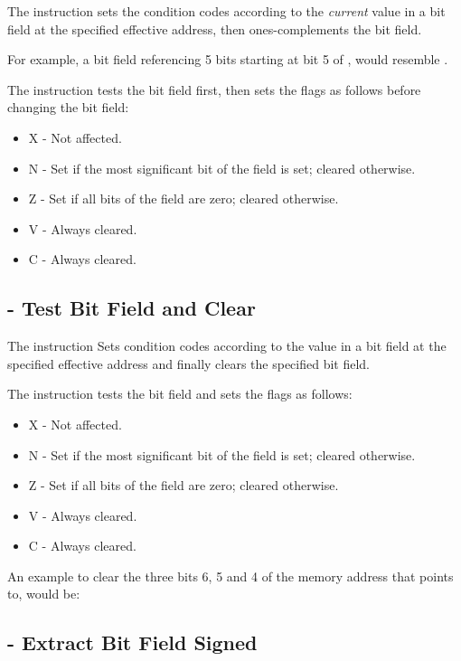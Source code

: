 The  instruction sets the condition codes according to the \emph{current} value in a bit field at the specified
effective address, then ones-complements the bit field.

For example, a bit field referencing 5 bits starting at bit 5 of , would resemble .

The instruction tests the bit field first, then sets the flags as follows before changing the bit field:

\begin{itemize}
    \item X - Not affected.
    \item N - Set if the most significant bit of the field is set; cleared otherwise.
    \item Z - Set if all bits of the field are zero; cleared otherwise.
    \item V - Always cleared.
    \item C - Always cleared.
\end{itemize}


\subsection{ - Test Bit Field and Clear}

The  instruction Sets condition codes according to the value in a bit field at the specified effective address and finally clears the specified bit field.

The instruction tests the bit field and sets the flags as follows:

\begin{itemize}
	\item X - Not affected.
	\item N - Set if the most significant bit of the field is set; cleared otherwise.
	\item Z - Set if all bits of the field are zero; cleared otherwise.
	\item V - Always cleared.
	\item C - Always cleared.
\end{itemize}

An example to clear the three bits 6, 5 and 4 of the memory address that  points to, would be:


\subsection{ - Extract Bit Field Signed}

